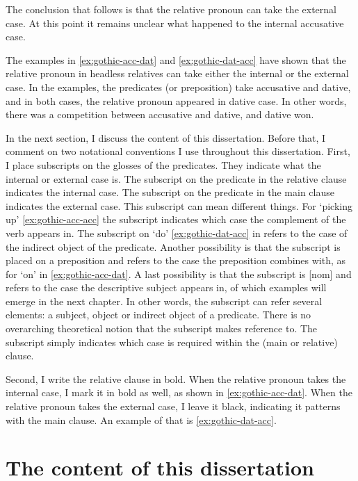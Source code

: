 The conclusion that follows is that the relative pronoun can take the external case. At this point it remains unclear what happened to the internal accusative case.

The examples in \ref{ex:gothic-acc-dat} and \ref{ex:gothic-dat-acc} have shown that the relative pronoun in headless relatives can take either the internal or the external case. In the examples, the predicates (or preposition) take accusative and dative, and in both cases, the relative pronoun appeared in dative case. In other words, there was a competition between accusative and dative, and dative won.

In the next section, I discuss the content of this dissertation. Before that, I comment on two notational conventions I use throughout this dissertation. First, I place subscripts on the glosses of the predicates. They indicate what the internal or external case is. The subscript on the predicate in the relative clause indicates the internal case. The subscript on the predicate in the main clause indicates the external case. This subscript can mean different things.
For  `picking up' \ref{ex:gothic-acc-acc} the subscript indicates which case the complement of the verb appears in. The subscript on  `do' \ref{ex:gothic-dat-acc} in refers to the case of the indirect object of the predicate. Another possibility is that the subscript is placed on a preposition and refers to the case the preposition combines with, as for  `on' in \ref{ex:gothic-acc-dat}. A last possibility is that the subscript is [\ac{nom}] and refers to the case the descriptive subject appears in, of which examples will emerge in the next chapter.
In other words, the subscript can refer several elements: a subject, object or indirect object of a predicate. There is no overarching theoretical notion that the subscript makes reference to. The subscript simply indicates which case is required within the (main or relative) clause.

Second, I write the relative clause in bold. When the relative pronoun takes the internal case, I mark it in bold as well, as shown in \ref{ex:gothic-acc-dat}. When the relative pronoun takes the external case, I leave it black, indicating it patterns with the main clause. An example of that is \ref{ex:gothic-dat-acc}.


\section{The content of this dissertation}

